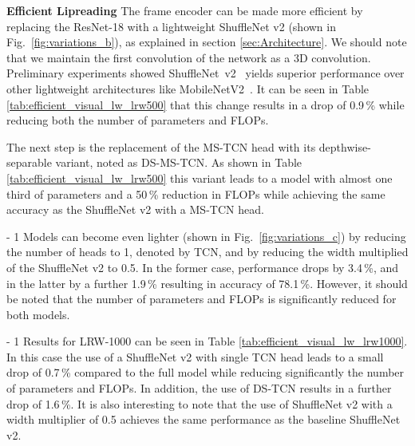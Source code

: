\documentclass{article}
\begin{document}
\noindent\textbf{Efficient Lipreading}\quad
The frame encoder can be made more efficient by replacing the ResNet-18 with a lightweight ShuffleNet v2 (shown in Fig.~\ref{fig:variations_b}), as explained in section \ref{sec:Architecture}. We should note that we maintain the first convolution of the network as a 3D convolution.  Preliminary experiments showed ShuffleNet~v2~\cite{ma2018shufflenet} yields superior performance over other lightweight architectures like MobileNetV2~\cite{sandler2018mobilenetv2}. It can be seen in Table \ref{tab:efficient_visual_lw_lrw500} that this change results in a drop of 0.9\,\% while reducing both the number of parameters and FLOPs.


The next step is the replacement of the MS-TCN head with its depthwise-separable variant, noted as DS-MS-TCN. As shown in Table \ref{tab:efficient_visual_lw_lrw500} this variant leads to a model with almost one third of parameters and a 50\,\% reduction in FLOPs while achieving the same  accuracy as the ShuffleNet v2 with a MS-TCN head.

\looseness - 1
Models can become even lighter (shown in Fig.~\ref{fig:variations_c}) by reducing the number of heads to 1, denoted by TCN,  and by reducing the width multiplied of the ShuffleNet v2 to 0.5. In the former case, performance drops by 3.4\,\%, and in the latter by a further 1.9\,\% resulting in accuracy of 78.1\,\%. However, it should be noted that the number of parameters and FLOPs is significantly reduced for both models.

\looseness - 1
Results for LRW-1000 can be seen in Table \ref{tab:efficient_visual_lw_lrw1000}. In this case the use of a ShuffleNet v2 with single TCN head leads to a small drop of 0.7\,\% compared to the full model while reducing significantly the number of parameters and FLOPs. In addition, the use of DS-TCN results in a further drop of 1.6\,\%. It is also interesting to note that the use of  ShuffleNet v2 with a width multiplier of 0.5 achieves the same performance as the baseline ShuffleNet v2.
\end{document}
